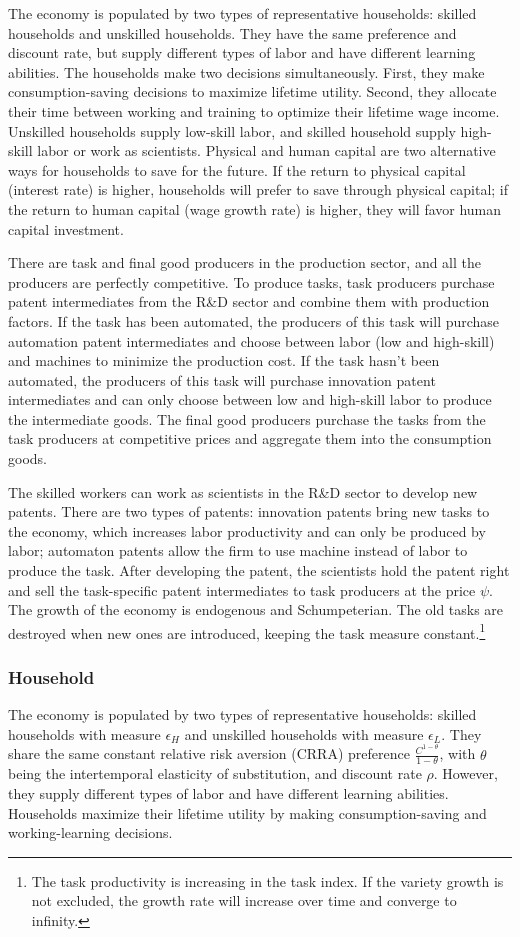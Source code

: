 \documentclass[12pt]{article}
\begin{document}
The economy is populated by two types of representative households: skilled households and unskilled households. They have the same preference and discount rate, but supply different types of labor and have different learning abilities. The households make two decisions simultaneously. First, they make consumption-saving decisions to maximize lifetime utility. Second, they allocate their time between working and training to optimize their lifetime wage income. Unskilled households supply low-skill labor, and skilled household supply high-skill labor or work as scientists. Physical and human capital are two alternative ways for households to save for the future. If the return to physical capital (interest rate) is higher, households will prefer to save through physical capital; if the return to human capital (wage growth rate) is higher, they will favor human capital investment. 

There are task and final good producers in the production sector, and all the producers are perfectly competitive. To produce tasks, task producers purchase patent intermediates from the R\&D sector and combine them with production factors. If the task has been automated, the producers of this task will purchase automation patent intermediates and choose between labor (low and high-skill) and machines to minimize the production cost. If the task hasn't been automated, the producers of this task will purchase innovation patent intermediates and can only choose between low and high-skill labor to produce the intermediate goods. The final good producers purchase the tasks from the task producers at competitive prices and aggregate them into the consumption goods. 

The skilled workers can work as scientists in the R\&D sector to develop new patents. There are two types of patents: innovation patents bring new tasks to the economy, which increases labor productivity and can only be produced by labor; automaton patents allow the firm to use machine instead of labor to produce the task. After developing the patent, the scientists hold the patent right and sell the task-specific patent intermediates to task producers at the price $\psi$. The growth of the economy is endogenous and Schumpeterian. The old tasks are destroyed when new ones are introduced, keeping the task measure constant.\footnote{The task productivity is increasing in the task index. If the variety growth is not excluded, the growth rate will increase over time and converge to infinity.} 

\subsubsection*{Household}
The economy is populated by two types of representative households: skilled households with measure $\epsilon_H$ and unskilled households with measure $\epsilon_L$. They share the same constant relative risk aversion (CRRA) preference $\frac{C^{1-\theta}}{1-\theta}$, with $\theta$ being the intertemporal elasticity of substitution, and discount rate $\rho$. However, they supply different types of labor and have different learning abilities. Households maximize their lifetime utility by making consumption-saving and working-learning decisions. 
\end{document}
